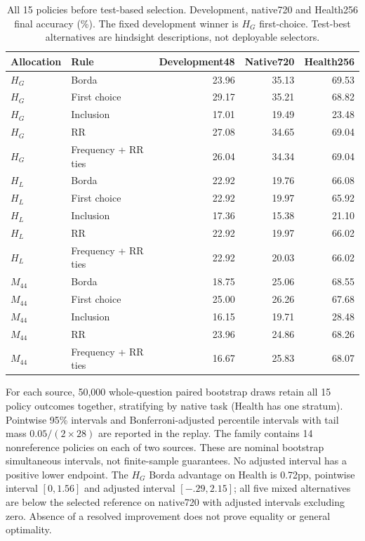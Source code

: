 \begin{table}[h]
\centering\small
\caption{All 15 policies before test-based selection. Development, native720 and Health256 final accuracy (\%). The fixed development winner is $H_G$ first-choice. Test-best alternatives are hindsight descriptions, not deployable selectors.}
\label{tab:joint_policy}
\begin{tabular}{llrrr}
\toprule
Allocation & Rule & Development48 & Native720 & Health256\\
\midrule
$H_G$ & Borda &23.96&35.13&69.53\\
$H_G$ & First choice &29.17&35.21&68.82\\
$H_G$ & Inclusion &17.01&19.49&23.48\\
$H_G$ & RR &27.08&34.65&69.04\\
$H_G$ & Frequency + RR ties &26.04&34.34&69.04\\
$H_L$ & Borda &22.92&19.76&66.08\\
$H_L$ & First choice &22.92&19.97&65.92\\
$H_L$ & Inclusion &17.36&15.38&21.10\\
$H_L$ & RR &22.92&19.97&66.02\\
$H_L$ & Frequency + RR ties &22.92&20.03&66.02\\
$M_{44}$ & Borda &18.75&25.06&68.55\\
$M_{44}$ & First choice &25.00&26.26&67.68\\
$M_{44}$ & Inclusion &16.15&19.71&28.48\\
$M_{44}$ & RR &23.96&24.86&68.26\\
$M_{44}$ & Frequency + RR ties &16.67&25.83&68.07\\
\bottomrule
\end{tabular}
\end{table}

For each source, 50,000 whole-question paired bootstrap draws retain all 15 policy outcomes together, stratifying by native task (Health has one stratum). Pointwise 95\% intervals and Bonferroni-adjusted percentile intervals with tail mass $0.05/(2\times28)$ are reported in the replay. The family contains 14 nonreference policies on each of two sources. These are nominal bootstrap simultaneous intervals, not finite-sample guarantees. No adjusted interval has a positive lower endpoint. The $H_G$ Borda advantage on Health is 0.72pp, pointwise interval $[0,1.56]$ and adjusted interval $[-.29,2.15]$; all five mixed alternatives are below the selected reference on native720 with adjusted intervals excluding zero. Absence of a resolved improvement does not prove equality or general optimality.


